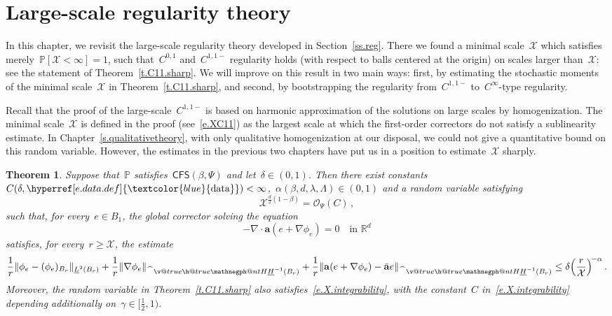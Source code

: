 \documentclass[11pt,twoside]{article} %
\makeatletter
\numberwithin{equation}{section}
\newtheorem{theorem}{Theorem}[section]
\theoremstyle{definition}
\newcommand{\dataref}{\hyperref[e.data.def]{\textcolor{blue}{\ensuremath{\mathrm{data}}}}}
\newcommand*{\R}{\ensuremath{\mathbb{R}}}
\renewcommand*{\hat}{\widehat}
\newcommand{\qand}{\quad \mbox{and} \quad }
\newcommand{\f}{\mathbf{f}}
\renewcommand{\a}{\mathbf{a}}
\newcommand{\ahom}{\bar{\a}}
\renewcommand{\P}{\mathbb{P}}
\newcommand{\X}{\mathcal{X}}
\renewcommand{\O}{\mathcal{O}}
\newcommand{\negphantom}{\v@true\h@true\negph@nt}
\newcommand{\negph@nt}{\ifmmode\expandafter\mathpalette 
  \expandafter\mathnegph@nt\else\expandafter\makenegph@nt\fi}
\newcommand{\makenegph@nt}[1]{%
  \setbox\z@\hbox{\color@begingroup#1\color@endgroup}\finnegph@nt}
\newcommand{\finnegph@nt}{%
  \setbox\tw@\null 
  \ifv@ \ht\tw@\ht\z@\dp\tw@\dp\z@\fi \ifh@\wd\tw@-\wd\z@\fi\box\tw@}
\newcommand{\mathnegph@nt}[2]{%
  \setbox\z@\hbox{$\m@th #1{#2}$}\finnegph@nt}
\newcommand{\Hminusul}{\hat{\phantom{H}}\negphantom{H}\underline{H}^{-1}}
\newcommand{\CFS}{\mathsf{CFS}}
\makeatother
\begin{document}
\section{Large-scale regularity theory}
\label{s.regularity} 


In this chapter, we revisit the large-scale regularity theory developed in Section~\ref{ss.reg}. There we found a minimal scale~$\X$ which satisfies merely~$\P[\X<\infty] = 1$, such that~$C^{0,1}$ and~$C^{1,1-}$ regularity holds (with respect to balls centered at the origin) on scales larger than~$\X$: see the statement of Theorem~\ref{t.C11.sharp}. 
We will improve on this result in two main ways: first, by estimating the stochastic moments of the minimal scale~$\X$ in Theorem~\ref{t.C11.sharp}, and second, by bootstrapping the regularity from~$C^{1,1-}$ to~$C^\infty$-type regularity. 

\smallskip

Recall that the proof of the large-scale~$C^{1,1-}$ is based on harmonic approximation of the solutions on large scales by homogenization. The minimal scale~$\X$ is defined in the proof (see~\eqref{e.XC11}) as the largest scale at which the first-order correctors do not satisfy a sublinearity estimate. In Chapter~\ref{s.qualitativetheory}, with only qualitative homogenization at our disposal, we could not give a quantitative bound on this random variable. However, the estimates in the previous two chapters have put us in a position to estimate~$\X$ sharply. 
 

\begin{theorem}
\label{t.optimalstochasticintegrability}
Suppose that~$\P$ satisfies~$\CFS(\beta,\Psi)$ and let~$\delta\in(0,1)$. Then there exist constants~$C(\delta,\dataref)<\infty$,~$\alpha(\beta,d,\lambda,\Lambda) \in (0,1)$  and a random variable satisfying   
\begin{equation} \label{e.X.integrability}
\X^{\frac d2(1-\beta)} = \O_\Psi(C)\,,
\end{equation}
such that, for every~$e \in B_1$, the global corrector solving the equation
\begin{equation*}  
- \nabla \cdot \a (e + \nabla \phi_e) = 0 \quad \mbox{in } \R^d
\end{equation*}
satisfies, for every~$r \geq \X$, the estimate
\begin{equation} \label{e.optimalstochasticintegrability}
\frac1r \|\phi_e - (\phi_e)_{B_r} \|_{\underline{L}^2(B_r)}
+
\frac1r \|\nabla \phi_e \|_{\Hminusul(B_r)} 
+ 
\frac1r \|\a(e + \nabla \phi_e) - \ahom e \|_{\Hminusul(B_r)} 
\leq 
\delta \Bigl(\frac{r}{\X} \Bigr)^{\!-\alpha} \,.
\end{equation}
Moreover, the random variable in Theorem~\ref{t.C11.sharp} also satisfies~\eqref{e.X.integrability}, with the constant~$C$ in~\eqref{e.X.integrability} depending additionally on~$\gamma \in [\tfrac12,1)$. 
\end{theorem}
\end{document}
